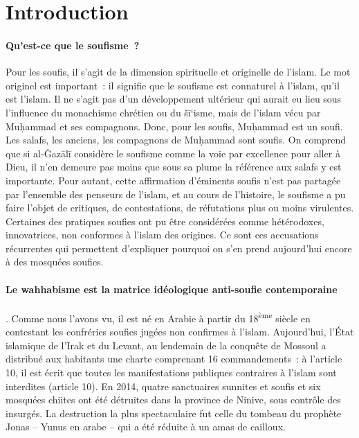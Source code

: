\section{Introduction}
\paragraph{ Qu'est-ce que le soufisme~?} Pour les soufis, il s'agit de la dimension
spirituelle et originelle de l'islam. Le mot originel est important~: il
signifie que le soufisme est connaturel à l'islam, qu'il est l'islam. Il
ne s'agit pas d'un développement ultérieur qui aurait eu lieu sous
l'influence du monachisme chrétien ou du šī`isme, mais de l'islam vécu
par Muḥammad et ses compagnons. Donc, pour les soufis, Muḥammad est un
soufi. Les salafs, les anciens, les compagnons de Muḥammad sont soufis.
On comprend que si al-Ġazālī \label{theol:AlGazali27} considère le soufisme comme la voie par
excellence pour aller à Dieu, il n'en demeure pas moins que sous sa
plume la référence aux salafs y est importante.
Pour autant, cette affirmation d'éminents soufis n'est pas partagée par
l'ensemble des penseurs de l'islam, et au cours de l'histoire, le
soufisme a pu faire l'objet de critiques, de contestations, de
réfutations plus ou moins virulentes. Certaines des pratiques soufies
ont pu être considérées comme hétérodoxes, innovatrices, non conformes à
l'islam des origines. Ce sont ces accusations récurrentes qui permettent
d'expliquer pourquoi on s'en prend aujourd'hui encore à des mosquées
soufies. 
\paragraph{Le wahhabisme est la matrice idéologique anti-soufie
contemporaine}. Comme nous l'avons vu, il est né en Arabie à partir du
18\textsuperscript{ème} siècle en contestant les confréries soufies
jugées non confirmes à l'islam. Aujourd'hui, l'État islamique de l'Irak
et du Levant, au lendemain de la conquête de Mossoul a distribué aux
habitants une charte comprenant 16 commandements~: à l'article 10, il
est écrit que toutes les manifestations publiques contraires à l'islam
sont interdites (article 10). En 2014, quatre sanctuaires sunnites et
soufis et six mosquées chiites ont été détruites dans la province de
Ninive, sous contrôle des insurgés. La destruction la plus spectaculaire
fut celle du tombeau du prophète Jonas -- Yunus en arabe -- qui a été
réduite à un amas de cailloux.

